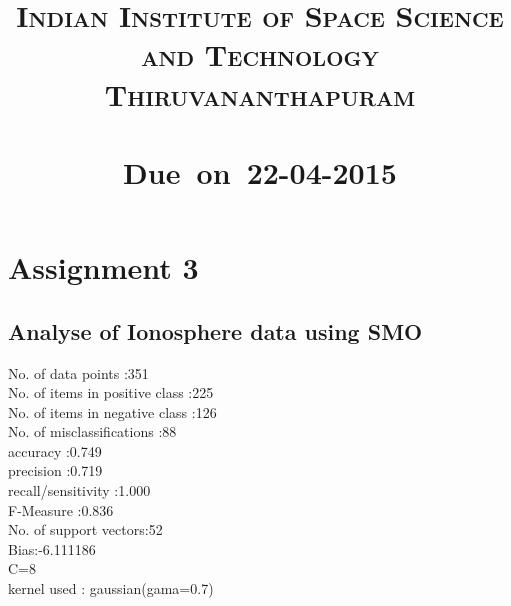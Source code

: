 \documentclass{article}
\title{
\textsc{Indian Institute of Space Science and Technology Thiruvananthapuram} \\ [25pt]
\vspace{2in}
\textmd{\textbf{\hmwkTitle}}\\
\normalsize\vspace{0.1in}\small{Due\ on\ 22-04-2015}\\
\vspace{3in}
}
\author{\textbf{\hmwkAuthorName}}
\date{} %
\begin{document}
\maketitle



\newpage
\newpage


\section{Assignment 3}

\subsection{\textbf{Analyse of Ionosphere data using SMO}}
No. of data points :351\\
No. of items in positive class :225\\
No. of items in negative class :126\\
No. of misclassifications :88\\
accuracy :0.749\\
precision :0.719\\
recall/sensitivity :1.000\\
F-Measure :0.836\\
No. of support vectors:52\\
Bias:-6.111186\\
C=8\\

kernel used : gaussian(gama=0.7)\\
\end{document}

